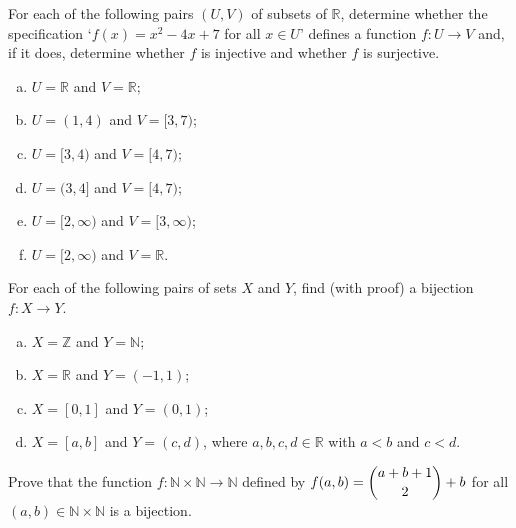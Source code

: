 \begin{chapex}
\label{cqInjectionSurjectionBijection}
For each of the following pairs $(U,V)$ of subsets of $\mathbb{R}$, determine whether the specification `$f(x) = x^2-4x+7$ for all $x \in U$' defines a function $f : U \to V$ and, if it does, determine whether $f$ is injective and whether $f$ is surjective.
\begin{multicols}{2}
\begin{enumerate}[(a)]
\item $U = \mathbb{R}$ and $V = \mathbb{R}$;
\item $U = (1, 4)$ and $V = [3, 7)$;
\item $U = [3, 4)$ and $V = [4, 7)$;
\item $U = (3, 4]$ and $V = [4, 7)$;
\item $U = [2, \infty)$ and $V = [3, \infty)$;
\item $U = [2,\infty)$ and $V = \mathbb{R}$.
\end{enumerate}
\end{multicols}
\end{chapex}

\begin{chapex}
For each of the following pairs of sets $X$ and $Y$, find (with proof) a bijection $f : X \to Y$.
\begin{enumerate}[(a)]
\item $X = \mathbb{Z}$ and $Y = \mathbb{N}$;
\item $X = \mathbb{R}$ and $Y = (-1,1)$;
\item $X = [0,1]$ and $Y = (0,1)$;
\item $X = [a,b]$ and $Y = (c,d)$, where $a,b,c,d \in \mathbb{R}$ with $a<b$ and $c<d$.
\end{enumerate}
\end{chapex}

\begin{chapex}
Prove that the function $f : \mathbb{N} \times \mathbb{N} \to \mathbb{N}$ defined by $f(a,b) = \dbinom{a+b+1}{2} + b$ for all $(a,b) \in \mathbb{N} \times \mathbb{N}$ is a bijection.
\end{chapex}